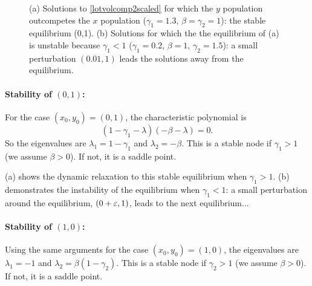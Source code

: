 \documentclass[main.tex]{subfiles}
\begin{document}
\begin{figure}
\begin{subfigure}[t]{0.49\textwidth}
	\centering
	
\end{subfigure}
\begin{subfigure}[t]{0.49\textwidth}
	\centering
	
\end{subfigure}
\caption{(a) Solutions to \cref{lotvolcomp2scaled} for which the $y$ population outcompetes the $x$ population ($\gamma_1=1.3$, $\beta=\gamma_2=1$): the stable equilibrium (0,1). (b) Solutions for which the the equilibrium of (a) is unstable because $\gamma_1<1$ ($\gamma_1=0.2$, $\beta=1$, $\gamma_2=1.5$): a small perturbation $(0.01,1)$ leads the solutions away from the equilibrium.}
\label{lotvolcompdecay}
\end{figure}

\paragraph{Stability of $(0,1)$:} For the case $(x_0,y_0) = (0,1)$, the characteristic polynomial is
\begin{equation}
(1-\gamma_1-\lambda)(-\beta -\lambda) = 0.
\end{equation}
So the eigenvalues are $\lambda_1 = 1- \gamma_1$ and $\lambda_2 = -\beta$. This is a stable node if $\gamma_1>1$ (we assume $\beta>0$). If not, it is a saddle point.

(a) shows the dynamic relaxation to this stable equilibrium when $\gamma_1>1$. (b) demonstrates the instability of the equilibrium when $\gamma_1<1$: a small perturbation around the equilibrium, $(0+\varepsilon,1)$, leads to the next equilibrium...

\paragraph{Stability of $(1,0)$:} Using the same arguments for the case $(x_0,y_0) = (1,0)$, the eigenvalues are $\lambda_1 = -1$ and $\lambda_2 = \beta(1-\gamma_2)$. This is a stable node if $\gamma_2>1$ (we assume $\beta>0$). If not, it is a saddle point. 
\end{document}

